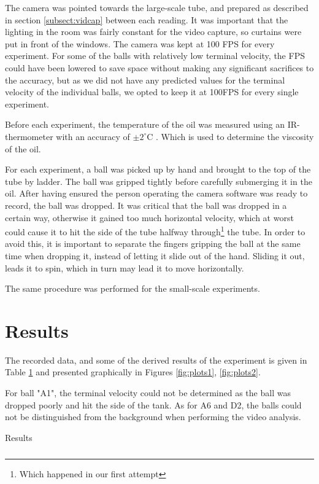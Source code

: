 \documentclass[11pt,a4paper]{article}
\begin{document}
    The camera was pointed towards the large-scale tube, and prepared as described in section \ref{subsect:vidcap} between each reading. It was important that the lighting in the room was fairly constant for the video capture, so curtains were put in front of the windows. The camera was kept at 100 FPS for every experiment. For some of the balls with relatively low terminal velocity, the FPS could have been lowered to save space without making any significant sacrifices to the accuracy, but as we did not have any predicted values for the terminal velocity of the individual balls, we opted to keep it at 100FPS for every single experiment.

    Before each experiment, the temperature of the oil was measured using an IR-thermometer with an accuracy of $\pm2^\circ$C \cite{_fluke_????}. Which is used to determine the viscosity of the oil.

    For each experiment, a ball was picked up by hand and brought to the top of the tube by ladder. The ball was gripped tightly before carefully submerging it in the oil. After having ensured the person operating the camera software was ready to record, the ball was dropped. It was critical that the ball was dropped in a certain way, otherwise it gained too much horizontal velocity, which at worst could cause it to hit the side of the tube halfway through\footnote{Which happened in our first attempt} the tube. In order to avoid this, it is important to separate the fingers gripping the ball at the same time when dropping it, instead of letting it slide out of the hand. Sliding it out, leads it to spin, which in turn may lead it to move horizontally.

    The same procedure was performed for the small-scale experiments.


\section{\label{sect:results}Results}

  The recorded data, and some of the derived results of the experiment is given in Table \ref{tab:results} and presented graphically in Figures \ref{fig:plots1}, \ref{fig:plots2}.

  For ball "A1", the terminal velocity could not be determined as the ball was dropped poorly and hit the side of the tank. As for A6 and D2, the balls could not be distinguished from the background when performing the video analysis.
  \begin{table}[H]
    \center
    \caption{Results}
    \begin{tabular}{ r | l  l  l  l  l  l  l l  l }
      
    \end{tabular}
    \label{tab:results}
  \end{table}
\end{document}
